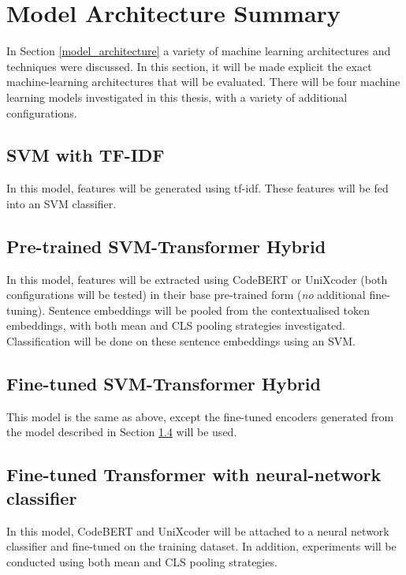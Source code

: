 \section{Model Architecture Summary}

In Section \ref{model_architecture} a variety of machine learning architectures and techniques were discussed. In this section, it will be made explicit the exact machine-learning architectures that will be evaluated. There will be four machine learning models investigated in this thesis, with a variety of additional configurations.

\subsection{SVM with TF-IDF}

\noindent
In this model, features will be generated using tf-idf. These features will be fed into an SVM classifier.

\subsection{Pre-trained SVM-Transformer Hybrid}

\noindent
In this model, features will be extracted using CodeBERT or UniXcoder (both configurations will be tested) in their base pre-trained form (\emph{no} additional fine-tuning). Sentence embeddings will be pooled from the contextualised token embeddings, with both mean and CLS pooling strategies investigated. Classification will be done on these sentence embeddings using an SVM.

\subsection{Fine-tuned SVM-Transformer Hybrid}

\noindent
This model is the same as above, except the fine-tuned encoders generated from the model described in Section \ref{fine-tuned-encoder} will be used.

\subsection{Fine-tuned Transformer with neural-network classifier}
\label{fine-tuned-encoder}

\noindent
In this model, CodeBERT and UniXcoder will be attached to a neural network classifier and fine-tuned on the training dataset. In addition, experiments will be conducted using both mean and CLS pooling strategies. \\

